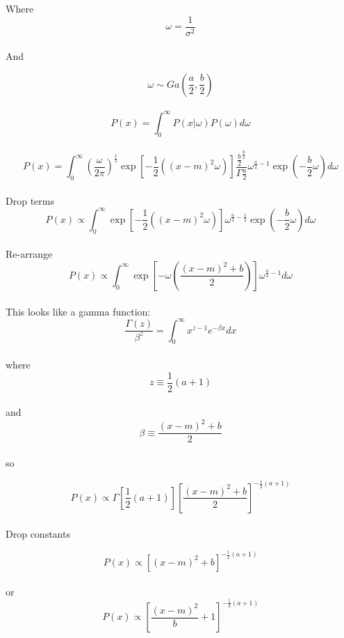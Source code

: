 \documentclass[12pt]{amsart}
\begin{document}
Where $$\omega = \frac{1}{\sigma^2}$$\\

And

$$\omega \sim Ga\left(  \frac{a}{2} , \frac{b}{2}         \right)$$\\

$$P(x) = \int_{0}^{\infty}P(x|\omega)P(\omega)d\omega$$\\

$$P(x) =\int_{0}^{\infty} \left(\frac{\omega}{2\pi}\right)^\frac{1}{2}\exp \left[ -\frac{1}{2}\left((x-m)^2\omega\right)\right] \frac{\frac{b}{2}^\frac{a}{2}}{\Gamma{\frac{a}{2}}}\omega^{\frac{a}{2}-1}  \exp\left (-\frac{b}{2}\omega \right)  d\omega $$\\

Drop terms\\

$$P(x) \propto\int_{0}^{\infty} \exp \left[ -\frac{1}{2}\left((x-m)^2\omega\right)\right] \omega^{\frac{a}{2}-\frac{1}{2}}  \exp\left (-\frac{b}{2}\omega \right)  d\omega $$\\

Re-arrange\\

$$P(x) \propto\int_{0}^{\infty} \exp \left[ -\omega\left(\frac{(x-m)^2+b}{2}\right)\right] \omega^{\frac{a}{2}-1}    d\omega $$\\


This looks like a gamma function:\\

$$ \frac{\Gamma(z)}{\beta^z} = \int_{0}^{\infty}x^{z-1}e^{-\beta x}dx$$\\

where $$ z \equiv \frac{1}{2}(a+1)$$\\

and \\

$$\beta \equiv \frac{(x-m)^2+b}{2}$$\\

so 

$$P(x) \propto \Gamma\left[\frac{1}{2}(a+1)\right] \left[\frac{(x-m)^2+b}{2}\right]^{-\frac{1}{2}(a+1)}$$\\

Drop constants 

$$P(x) \propto \left[(x-m)^2+b\right]^{-\frac{1}{2}(a+1)}$$\\

or 
$$P(x) \propto \left[\frac{(x-m)^2}{b}+1\right]^{-\frac{1}{2}(a+1)}$$\\
\end{document}
